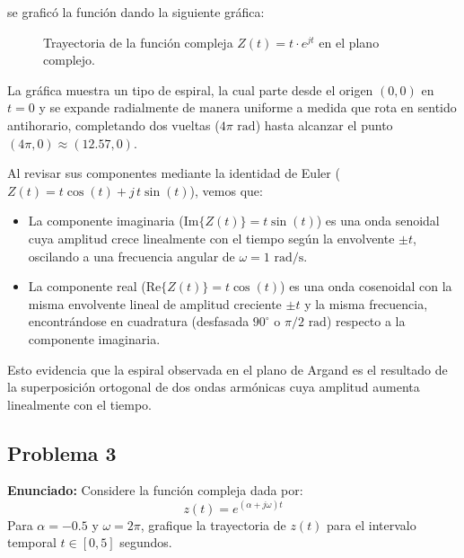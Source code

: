 \documentclass[11pt,a4paper]{article}
\begin{document}
\noindent se graficó la función dando la siguiente gráfica:

\begin{figure}[htbp]
    \centering
    \caption{Trayectoria de la función compleja $Z(t) = t \cdot e^{jt}$ en el plano complejo.}
    \label{fig:problema2_trayectoria}
\end{figure}

La gráfica muestra un tipo de espiral, la cual parte desde el origen $(0,0)$ en $t = 0$ y se expande radialmente de manera uniforme a medida que rota en sentido antihorario, completando dos vueltas ($4\pi\text{ rad}$) hasta alcanzar el punto $(4\pi, 0) \approx (12.57, 0)$.

Al revisar sus componentes mediante la identidad de Euler ($Z(t) = t\cos(t) + j\, t\sin(t)$), vemos que:
\begin{itemize}
    \item La componente imaginaria ($\text{Im}\{Z(t)\} = t\sin(t)$) es una onda senoidal cuya amplitud crece linealmente con el tiempo según la envolvente $\pm t$, oscilando a una frecuencia angular de $\omega = 1\text{ rad/s}$.
    \item La componente real ($\text{Re}\{Z(t)\} = t\cos(t)$) es una onda cosenoidal con la misma envolvente lineal de amplitud creciente $\pm t$ y la misma frecuencia, encontrándose en cuadratura (desfasada $90^\circ$ o $\pi/2\text{ rad}$) respecto a la componente imaginaria.
\end{itemize}
Esto evidencia que la espiral observada en el plano de Argand es el resultado de la superposición ortogonal de dos ondas armónicas cuya amplitud aumenta linealmente con el tiempo.

\subsection{Problema 3}

\noindent\textbf{Enunciado:} Considere la función compleja dada por:
\[
z(t) = e^{(\alpha + j\omega)t}
\]
Para $\alpha = -0.5$ y $\omega = 2\pi$, grafique la trayectoria de $z(t)$ para el intervalo temporal $t \in [0, 5]$ segundos.
\end{document}
